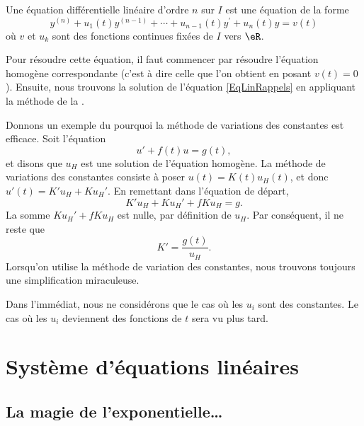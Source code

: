 Une équation différentielle linéaire d'ordre $n$ sur $I$ est une équation de la forme
\begin{equation}	\label{EqLinRappels}
	y^{(n)} + u_1(t) y^{(n-1)} + \cdots + u_{n-1}(t) y^\prime + u_n(t) y = v(t)
\end{equation}
où $v$ et $u_k$ sont des fonctions continues fixées de $I$ vers $\eR$.

Pour résoudre cette équation, il faut commencer par résoudre l'équation homogène correspondante (c'est à dire celle que l'on obtient en posant $v(t)=0$). Ensuite, nous trouvons la solution de l'équation \eqref{EqLinRappels} en appliquant la méthode de la .

Donnons un exemple du pourquoi la méthode de variations des constantes est efficace. Soit l'équation 
\begin{equation}		\label{EqDiffExempleVarCst}
	u'+f(t)u=g(t),
\end{equation}
 et disons que $u_H$ est une solution de l'équation homogène. La méthode de variations des constantes consiste à poser $u(t)=K(t)u_H(t)$, et donc $u'(t)=K'u_H+Ku_H'$. En remettant dans l'équation de départ,
\begin{equation}
	K'u_H+Ku_H'+fKu_H=g.
\end{equation}
La somme $Ku_H'+fKu_H$ est nulle, par définition de $u_H$. Par conséquent, il ne reste que
\begin{equation}
	K'=\frac{ g(t) }{ u_H }.
\end{equation}
Lorsqu'on utilise la méthode de variation des constantes, nous trouvons toujours une simplification \og miraculeuse\fg.

Dans l'immédiat, nous ne considérons que le cas où les \( u_i\) sont des constantes. Le cas où les \( u_i\) deviennent des fonctions de \( t\) sera vu plus tard.

\section{Système d'équations linéaires}

					\subsection{La magie de l'exponentielle\ldots}

